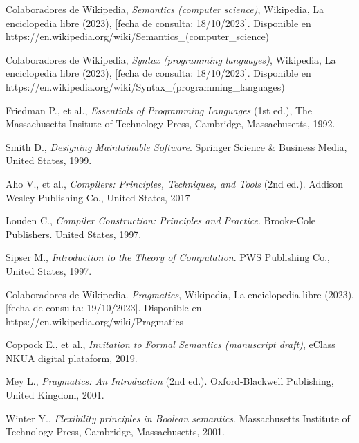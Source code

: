 \begin{thebibliography}{11}
    \bibitem{}
    \label{sec:28}
    \hypertarget{28}{}
    Colaboradores de Wikipedia, \textit{Semantics (computer science)}, Wikipedia, La enciclopedia libre (2023), [fecha de consulta: 18/10/2023]. Disponible en https://en.wikipedia.org/wiki/Semantics\_(computer\_science)

    \bibitem{}
    \label{sec:29}
    \hypertarget{29}{}
    Colaboradores de Wikipedia, \textit{Syntax (programming languages)}, Wikipedia, La enciclopedia libre (2023), [fecha de consulta: 18/10/2023]. Disponible en https://en.wikipedia.org/wiki/Syntax\_(programming\_languages)

    \bibitem{}
    \label{sec:30}
    \hypertarget{30}{}
    Friedman P., et al., \textit{Essentials of Programming Languages} (1st ed.), The Massachusetts Insitute of Technology Press, Cambridge, Massachusetts, 1992.

    \bibitem{}
    \label{sec:31}
    \hypertarget{31}{}
    Smith D., \textit{Designing Maintainable Software}. Springer Science \& Business Media, United States, 1999.

    \bibitem{}
    \label{sec:32}
    \hypertarget{32}{}
    Aho V., et al.,  \textit{Compilers: Principles, Techniques, and Tools} (2nd ed.). Addison Wesley Publishing Co., United States, 2017

    \bibitem{}
    \label{sec:33}
    \hypertarget{33}{}
    Louden C., \textit{Compiler Construction: Principles and Practice}. Brooks-Cole Publishers. United States, 1997. %

    \bibitem{}
    \label{sec:34}
    \hypertarget{34}{}
    Sipser M., \textit{Introduction to the Theory of Computation}. PWS Publishing Co., United States, 1997.%

    \bibitem{}
    \label{sec:35}
    \hypertarget{35}{}
    Colaboradores de Wikipedia. \textit{Pragmatics}, Wikipedia, La enciclopedia libre (2023), [fecha de consulta: 19/10/2023]. Disponible en https://en.wikipedia.org/wiki/Pragmatics

    \bibitem{}
    \label{sec:36}
    \hypertarget{36}{}
    Coppock E., et al., \textit{Invitation to Formal Semantics (manuscript draft)}, eClass NKUA digital plataform, 2019.%

    \bibitem{}
    \label{sec:37}
    \hypertarget{37}{}
    Mey L., \textit{Pragmatics: An Introduction} (2nd ed.). Oxford-Blackwell Publishing, United Kingdom, 2001.

    \bibitem{}
    \label{sec:38}
    \hypertarget{38}{}
    Winter Y., \textit{Flexibility principles in Boolean semantics}. Massachusetts Institute of Technology Press, Cambridge, Massachusetts, 2001.


\end{thebibliography}
